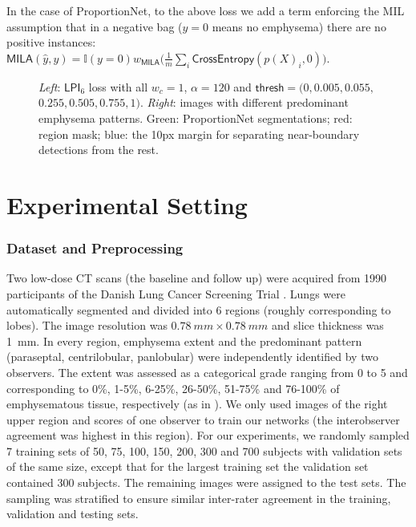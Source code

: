 \documentclass{llncs}
\begin{document}
In the case of ProportionNet, to the above loss we add a term enforcing the MIL assumption that in a negative bag ($y = 0$ means no emphysema) there are no positive instances:
$\textsf{MILA}(\hat{y}, y) =
\mathbb{I}(y = 0)
w_\textsf{MILA}
\big(
\frac{1}{m}\sum_i{\textsf{CrossEntropy}(p(X)_i, 0)}
\big)$.


\begin{figure}%
    \caption{
\textit{Left}: $\textsf{LPI}_6$ loss with all $w_c = 1$, $\alpha = 120$ and $\textsf{thresh} = (0, 0.005, 0.055, $ $0.255, 0.505, 0.755, 1)$.
\textit{Right}: images with different predominant emphysema patterns.
Green: ProportionNet segmentations; red: region mask; blue: the 10px margin for separating near-boundary detections from the rest.
    }%
    \label{loss_pat}%
\end{figure}
\section{Experimental Setting}\label{exp}

\subsubsection{Dataset and Preprocessing}
Two low-dose CT scans (the baseline and follow up) were acquired from 1990 participants of the Danish Lung Cancer Screening Trial \cite{Wille2014}.
Lungs were automatically segmented and divided into 6 regions (roughly corresponding to lobes).
The image resolution was $\SI{0.78}{mm} \times \SI{0.78}{mm}$ and slice thickness was \SI{1}{mm}.
In every region, emphysema extent and the predominant pattern (paraseptal, centrilobular, panlobular) were independently identified by two observers.
The extent was assessed as a categorical grade ranging from 0 to 5 and corresponding to 0\%, 1-5\%, 6-25\%, 26-50\%, 51-75\% and 76-100\% of emphysematous tissue, respectively (as in \cite{Wille2014}).
We only used images of the right upper region and scores of one observer to train our networks (the interobserver agreement was highest in this region).
For our experiments, we randomly sampled 7 training sets of 50, 75, 100, 150, 200, 300 and 700 subjects with validation sets of the same size, except that for the largest training set the validation set contained 300 subjects.
The remaining images were assigned to the test sets.
The sampling was stratified to ensure similar inter-rater agreement in the training, validation and testing sets.
\end{document}
